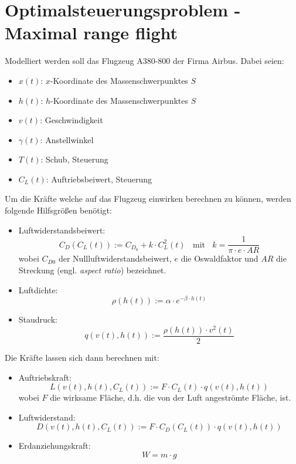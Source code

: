 \chapter{Optimalsteuerungsproblem - \glqq Maximal range flight\grqq{}}

Modelliert werden soll das Flugzeug A380-800 der Firma Airbus. Dabei seien:
\begin{itemize}
    \item $x(t)$: $x$-Koordinate des Massenschwerpunktes $S$
    \item $h(t)$: $h$-Koordinate des Massenschwerpunktes $S$
    \item $v(t)$: Geschwindigkeit
    \item $\gamma(t)$: Anstellwinkel
    \item $T(t)$: Schub, Steuerung
    \item $C_L(t)$: Auftriebsbeiwert, Steuerung
\end{itemize}
Um die Kräfte welche auf das Flugzeug einwirken berechnen zu können, werden folgende Hilfsgrößen benötigt:
\begin{itemize}
    \item Luftwiderstandsbeiwert: \[C_D(C_L(t)) := C_{D_0} + k \cdot C^2_L(t) \ \ \ \ \text{mit} \ \ \ \ k = \dfrac{1}{\pi \cdot e \cdot AR}\] wobei $C_{D0}$ der Nullluftwiderstandsbeiwert, $e$ die Oswaldfaktor und $AR$ die Streckung (engl. \textit{aspect ratio}) bezeichnet.
    \item Luftdichte: \[\rho(h(t)) := \alpha \cdot e^{-\beta \cdot h(t)}\] %
    \item Staudruck: \[q(v(t), h(t)) := \dfrac{\rho(h(t)) \cdot v^2(t)}{2} \]
\end{itemize}
Die Kräfte lassen sich dann berechnen mit:
\begin{itemize}
    \item Auftriebskraft: \[L(v(t), h(t), C_L(t)) := F \cdot C_L(t) \cdot q(v(t), h(t))\] wobei $F$ die wirksame Fläche, d.h. die von der Luft angeströmte Fläche, ist.
    \item Luftwiderstand: \[D(v(t), h(t), C_L(t)) := F \cdot C_D(C_L(t)) \cdot q(v(t), h(t))\]
    \item Erdanziehungskraft: \[W = m \cdot g\]
\end{itemize}

